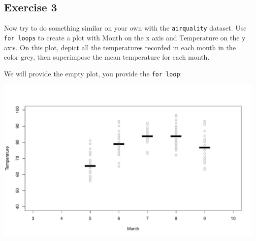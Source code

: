 \documentclass[
]{book}
\newenvironment{Shaded}{\begin{snugshade}}{\end{snugshade}}
\newcommand{\CommentTok}[1]{\textcolor[rgb]{0.56,0.35,0.01}{\textit{#1}}}
\newcommand{\ControlFlowTok}[1]{\textcolor[rgb]{0.13,0.29,0.53}{\textbf{#1}}}
\newcommand{\DataTypeTok}[1]{\textcolor[rgb]{0.13,0.29,0.53}{#1}}
\newcommand{\DecValTok}[1]{\textcolor[rgb]{0.00,0.00,0.81}{#1}}
\newcommand{\KeywordTok}[1]{\textcolor[rgb]{0.13,0.29,0.53}{\textbf{#1}}}
\newcommand{\NormalTok}[1]{#1}
\newcommand{\OperatorTok}[1]{\textcolor[rgb]{0.81,0.36,0.00}{\textbf{#1}}}
\newcommand{\StringTok}[1]{\textcolor[rgb]{0.31,0.60,0.02}{#1}}
\begin{document}
\hypertarget{exercise-3-3}{%
\subsection*{Exercise 3}\label{exercise-3-3}}

Now try to do something similar on your own with the \texttt{airquality} dataset. Use \texttt{for\ loops} to create a plot with Month on the x axis and Temperature on the y axis. On this plot, depict all the temperatures recorded in each month in the color grey, then superimpose the mean temperature for each month.

We will provide the empty plot, you provide the \texttt{for\ loop}:

\begin{Shaded}
\end{Shaded}

\includegraphics{figures/unnamed-chunk-232-1.pdf}
\end{document}
